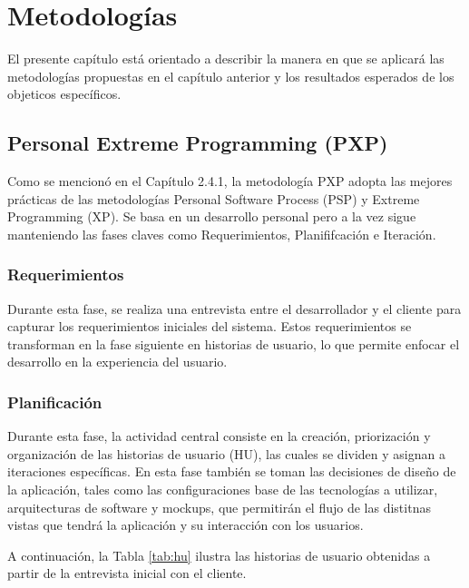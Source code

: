 \chapter{Metodologías}

El presente capítulo está orientado a describir la manera en que se aplicará las metodologías propuestas en el capítulo anterior y los resultados esperados de los objeticos específicos.

\section{Personal Extreme Programming (PXP)}

Como se mencionó en el Capítulo 2.4.1, la metodología PXP adopta las mejores prácticas de las metodologías Personal Software Process (PSP) y Extreme Programming (XP). Se basa en un desarrollo personal pero a la vez sigue manteniendo las fases claves como Requerimientos, Planififcación e Iteración.

\subsection{Requerimientos }

Durante esta fase, se realiza una entrevista entre el desarrollador y el cliente para capturar los requerimientos iniciales del sistema. Estos requerimientos se transforman en la fase siguiente en historias de usuario, lo que permite enfocar el desarrollo en la experiencia del usuario.

\subsection{Planificación}

Durante esta fase, la actividad central consiste en la creación, priorización y organización de las historias de usuario (HU), las cuales se dividen y asignan a iteraciones específicas. En esta fase también se toman las decisiones de diseño de la aplicación, tales como las configuraciones base de las tecnologías a utilizar, arquitecturas de software y mockups, que permitirán el flujo de las distitnas vistas que tendrá la aplicación y su interacción con los usuarios.

A continuación, la Tabla \ref{tab:hu} ilustra las historias de usuario obtenidas a partir de la entrevista inicial con el cliente.

